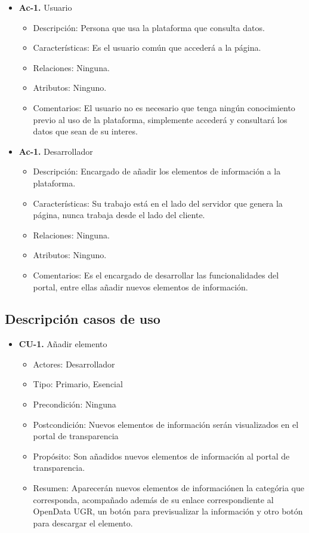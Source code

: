 \begin{itemize}
  \item \textbf{Ac-1.} Usuario
  \begin{itemize}
   \item Descripción: Persona que usa la plataforma que consulta datos.
   \item Características: Es el usuario común que accederá a la página.
   \item Relaciones: Ninguna.
   \item Atributos: Ninguno.
   \item Comentarios: El usuario no es necesario que tenga ningún conocimiento previo al uso de la plataforma, simplemente
   accederá y consultará los datos que sean de su interes.
  \end{itemize}
    \item \textbf{Ac-1.} Desarrollador
  \begin{itemize}
   \item Descripción: Encargado de añadir los elementos de información a la plataforma.
   \item Características: Su trabajo está en el lado del servidor que genera la página, nunca trabaja desde el lado del cliente.
   \item Relaciones: Ninguna.
   \item Atributos: Ninguno.
   \item Comentarios: Es el encargado de desarrollar las funcionalidades del portal, entre ellas añadir nuevos elementos de
   información.
  \end{itemize}
\end{itemize}

\subsection{Descripción casos de uso}

\begin{itemize}
 \item \textbf{CU-1.} Añadir elemento
 \begin{itemize}
  \item Actores: Desarrollador
  \item Tipo: Primario, Esencial
  \item Precondición: Ninguna
  \item Postcondición: Nuevos elementos de información serán visualizados en el portal de transparencia
  \item Propósito: Son añadidos nuevos elementos de información al portal de transparencia.
  \item Resumen: Aparecerán nuevos elementos de informaciónen la categória que corresponda, acompañado además de su enlace
  correspondiente al OpenData UGR, un botón para previsualizar la información y otro botón para descargar el elemento.
 \end{itemize}
\end{itemize}

